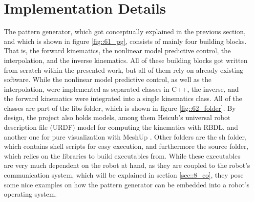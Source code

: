 \FloatBarrier
\section{Implementation Details}
\label{sec::62_id}
The pattern generator, which got conceptually explained in the previous section, and which is shown in figure \ref{fig::61_pg}, consists of mainly four building blocks. That is, the forward kinematics, the nonlinear model predictive control, the interpolation, and the inverse kinematics. All of these building blocks got written from scratch within the presented work, but all of them rely on already existing software. While the nonlinear model predictive control, as well as the interpolation, were implemented as separated classes in C++, the inverse, and the forward kinematics were integrated into a single kinematics class. All of the classes are part of the libs folder, which is shown in figure \ref{fig::62_folder}. By design, the project also holds models, among them Heicub's universal robot description file (URDF) model for computing the kinematics with RBDL, and another one for pure visualization with MeshUp \cite{meshup}. Other folders are the sh folder, which contains shell scripts for easy execution, and furthermore the source folder, which relies on the libraries to build executables from. While these executables are very much dependent on the robot at hand, as they are coupled to the robot's communication system, which will be explained in section \ref{sec::8_co}, they pose some nice examples on how the pattern generator can be embedded into a robot's operating system.
